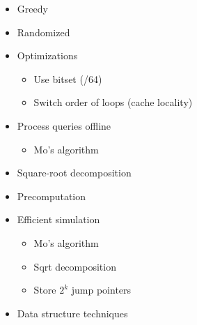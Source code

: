 \documentclass[8pt,a4paper,landscape,oneside]{amsart}
\newenvironment{myitemize}
{ \begin{itemize}[leftmargin=.5cm]
    \setlength{\itemsep}{0pt}
    \setlength{\parskip}{0pt}
    \setlength{\parsep}{0pt}     }
{ \end{itemize}                  }
\begin{document}
\begin{multicols*}{3}
\begin{myitemize}
\begin{itemize}
\begin{itemize}
                                \item Knuth optimization
                                    \begin{itemize}
                                        \item $\mathrm{dp}[i][j] = \min_{i<k<j}\{\mathrm{dp}[i][k] + \mathrm{dp}[k][j] + C[i][j]\}$
                                        \item $A[i][j-1] \leq A[i][j] \leq A[i+1][j]$
                                        \item $O(n^3)$ to $O(n^2)$
                                        \item sufficient: QI and $C[b][c] \leq C[a][d]$, $a\leq b\leq c\leq d$
                                    \end{itemize}
                            \end{itemize}
                    \end{itemize}
                \item Greedy
                \item Randomized
                \item Optimizations
                    \begin{itemize}
                        \item Use bitset (/64)
                        \item Switch order of loops (cache locality)
                    \end{itemize}
                \item Process queries offline
                    \begin{itemize}
                        \item Mo's algorithm
                    \end{itemize}
                \item Square-root decomposition
                \item Precomputation
                \item Efficient simulation
                    \begin{itemize}
                        \item Mo's algorithm
                        \item Sqrt decomposition
                        \item Store $2^k$ jump pointers
                    \end{itemize}
                \item Data structure techniques

\end{myitemize}
\end{multicols*}
\end{document}

